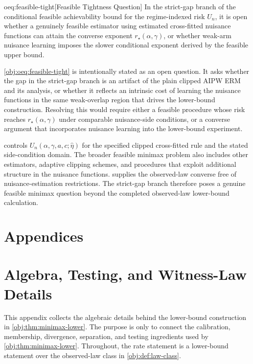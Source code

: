 \documentclass[11pt]{article}
\begin{document}
\begin{definitionv}{oeq:feasible-tight}[Feasible Tightness Question]
In the strict-gap branch of the conditional feasible achievability bound for the regime-indexed risk \(U_n\), it is open whether a genuinely feasible estimator using estimated cross-fitted nuisance functions can attain the converse exponent \(r_\star(\alpha,\gamma)\), or whether weak-arm nuisance learning imposes the slower conditional exponent derived by the feasible upper bound.
\end{definitionv}

\cref{obj:oeq:feasible-tight} is intentionally stated as an open question.  It asks whether the gap in the strict-gap branch is an artifact of the plain clipped AIPW ERM and its analysis, or whether it reflects an intrinsic cost of learning the nuisance functions in the same weak-overlap region that drives the lower-bound construction.  Resolving this would require either a feasible procedure whose risk reaches \(r_\star(\alpha,\gamma)\) under comparable nuisance-side conditions, or a converse argument that incorporates nuisance learning into the lower-bound experiment.

 controls \(U_n(\alpha,\gamma,a,c;\widehat\eta)\) for the specified clipped cross-fitted rule and the stated side-condition domain.  The broader feasible minimax problem also includes other estimators, adaptive clipping schemes, and procedures that exploit additional structure in the nuisance functions.   supplies the observed-law converse free of nuisance-estimation restrictions.  The strict-gap branch therefore poses a genuine feasible minimax question beyond the completed observed-law lower-bound calculation.


\appendix

\section*{Appendices}

\section{Algebra, Testing, and Witness-Law Details}

This appendix collects the algebraic details behind the lower-bound construction in \cref{obj:thm:minimax-lower}.  The purpose is only to connect the calibration, membership, divergence, separation, and testing ingredients used by \cref{obj:thm:minimax-lower}.  Throughout, the rate statement is a lower-bound statement over the observed-law class in \cref{obj:def:law-class}.
\end{document}
